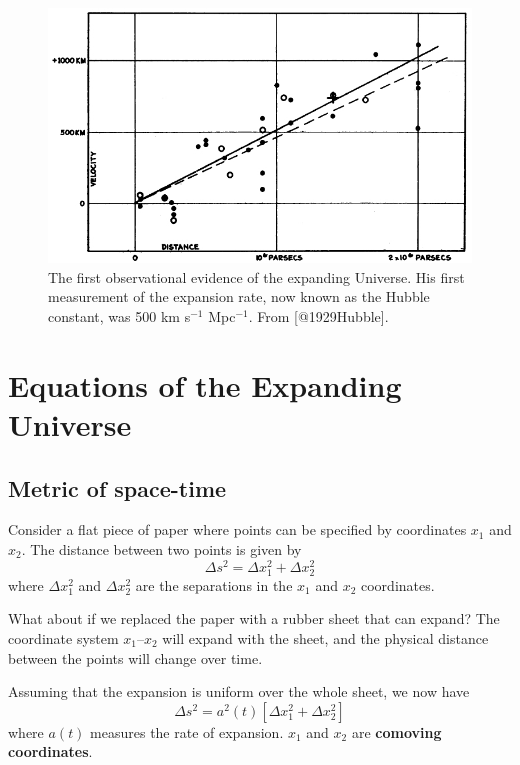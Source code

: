 \documentclass[]{book}
\begin{document}
\begin{figure}
\includegraphics[width=1\linewidth]{Images/hubble-diagram} \caption{The first observational evidence of the expanding Universe. His first measurement of the expansion rate, now known as the Hubble constant, was 500 km s$^{-1}$ Mpc$^{-1}$. From [@1929Hubble].}\label{fig:hubble-h0-diagram}
\end{figure}

\hypertarget{ch:eqs_of_expanding}{%
\chapter{Equations of the Expanding Universe}\label{ch:eqs_of_expanding}}

\hypertarget{sec:metric}{%
\section{Metric of space-time}\label{sec:metric}}

Consider a flat piece of paper where points can be specified by
coordinates \(x_1\) and \(x_2\). The distance between two points is given by
\begin{equation}
\Delta s^2 = \Delta x_{1}^{2} + \Delta x_{2}^{2}
\label{eq:dist01}
\end{equation}
where
\(\Delta x_{1}^{2}\) and \(\Delta x_{2}^{2}\) are the separations in the
\(x_1\) and \(x_2\) coordinates.

What about if we replaced the paper with a rubber sheet that can expand?
The coordinate system \(x_1\)--\(x_2\) will expand with the sheet, and the
physical distance between the points will change over time.

Assuming that the expansion is uniform over the whole sheet, we now have
\begin{equation}
\Delta s^2 = a^2(t)\left[\Delta x_{1}^{2} + \Delta x_{2}^{2}\right]
\label{eq:comoving01}
\end{equation}
where \(a(t)\) measures the rate of expansion. \(x_1\) and \(x_2\) are
\textbf{comoving coordinates}.
\end{document}
